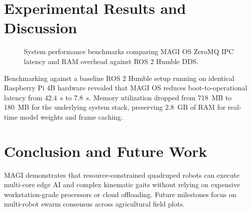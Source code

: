 \documentclass[conference]{IEEEtran}
\begin{document}
\section{Experimental Results and Discussion}

\begin{figure}[t]
\centering
\fbox{\rule{0pt}{1.8in} \rule{0.9\linewidth}{0pt}}
\caption{System performance benchmarks comparing MAGI OS ZeroMQ IPC latency and RAM overhead against ROS 2 Humble DDS.}
\label{fig:benchmark}
\end{figure}

Benchmarking against a baseline ROS 2 Humble setup running on identical Raspberry Pi 4B hardware revealed that MAGI OS reduces boot-to-operational latency from 42.4~s to 7.8~s. Memory utilization dropped from 718~MB to 180~MB for the underlying system stack, preserving 2.8~GB of RAM for real-time model weights and frame caching.

\section{Conclusion and Future Work}
MAGI demonstrates that resource-constrained quadruped robots can execute multi-core edge AI and complex kinematic gaits without relying on expensive workstation-grade processors or cloud offloading. Future milestones focus on multi-robot swarm consensus across agricultural field plots.



\end{document}

